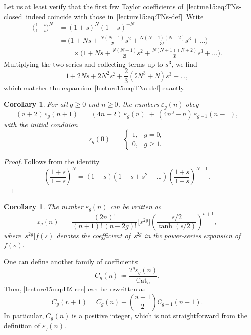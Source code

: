 \documentclass[letterpaper,11pt,oneside,reqno]{book}
\numberwithin{equation}{chapter}  %
\newtheorem{corollary}[proposition]{Corollary}
\theoremstyle{definition}
\begin{document}
Let us at least
verify that
the first few Taylor coefficients of~\eqref{lecture15:eq:TNs-closed}
indeed coincide with those in~\eqref{lecture15:eq:TNs-def}.
Write
\begin{align*}
  \Biggl(\frac{1+s}{1-s}\Biggr)^N
  &= (1+s)^N (1-s)^{-N} \\
  &=
  \Biggl(1 + Ns + \frac{N(N-1)}{2!}s^2 + \frac{N(N-1)(N-2)}{3!}s^3 + \dots\Biggr) \\
  &\qquad\times
  \Biggl(1 + Ns + \frac{N(N+1)}{2!}s^2 + \frac{N(N+1)(N+2)}{3!}s^3 + \dots\Biggr).
\end{align*}
Multiplying the two series and collecting terms up to $s^3$, we find
\[
  1 + 2N s + 2N^2 s^2 + \frac{2}{3}(2N^3 + N) s^3 + \dots,
\]
which matches the expansion~\eqref{lecture15:eq:TNs-def} exactly.




\begin{corollary}\label{lecture15:cor:HZ-recurrence} %
For all $g\ge 0$ and $n\ge 0$, the numbers $\varepsilon_g(n)$ obey
\begin{equation}\label{lecture15:eq:HZ-rec} %
  (n+2)\,\varepsilon_g(n+1)
  \;=\;
  (4n+2)\,\varepsilon_g(n)
  \;+\;
  (4n^{3}-n)\,\varepsilon_{g-1}(n-1),
\end{equation}
with the initial condition
\[
  \varepsilon_g(0)
  \;=\;
  \begin{cases}
    1,& g=0,\\[4pt]
    0,& g\ge 1.
  \end{cases}
\]
\end{corollary}
\begin{proof}
	Follows from the identity
	\begin{equation*}
		\left( \frac{1+s}{1-s} \right)^{N}=
		(1+s)(1+s+s^2+\ldots )\left( \frac{1+s}{1-s} \right)^{N-1}.
	\end{equation*}
\end{proof}

\begin{corollary}\label{lecture15:cor:epsg-explicit}
The number $\varepsilon_g(n)$ can be written as
\[
\varepsilon_g(n)\;=\;\frac{(2n)!}{(n+1)!\,(n-2g)!}\,
\bigl[s^{2g}\bigr]\!
\left(\frac{s/2}{\tanh(s/2)}\right)^{n+1},
\]
where $\bigl[s^{2g}\bigr]f(s)$ denotes the coefficient of $s^{2g}$ in the power‑series expansion of $f(s)$.
\end{corollary}



One can define another family of coefficients:
\begin{equation*}
	C_g(n)\coloneqq \frac{2^g \varepsilon_g(n)}{\mathrm{Cat}_n}.
\end{equation*}
Then, \eqref{lecture15:eq:HZ-rec} can be rewritten as
\begin{equation*}
	C_g(n+1)=C_g(n)+\binom{n+1}2 C_{g-1}(n-1).
\end{equation*}
In particular, $C_g(n)$ is a positive integer, which is not straightforward from the
definition of $\varepsilon_g(n)$.
\end{document}
